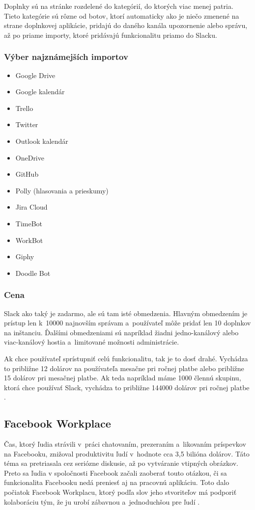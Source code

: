 \indent Doplnky sú na stránke rozdelené do kategórií, do ktorých viac menej patria. Tieto kategórie sú rôzne od botov, ktorí automaticky ako je niečo zmenené na strane doplnkovej aplikácie, pridajú do daného kanála upozornenie alebo správu, až po priame importy, ktoré pridávajú funkcionalitu priamo do Slacku.
\subsubsection{Výber najznámejších importov}
\begin{itemize}
    \item Google Drive
    \item Google kalendár
    \item Trello
    \item Twitter
    \item Outlook kalendár
    \item OneDrive
    \item GitHub
    \item Polly (hlasovania a prieskumy)
    \item Jira Cloud
    \item TimeBot
    \item WorkBot
    \item Giphy
    \item Doodle Bot
\end{itemize}
\subsubsection{Cena}
\indent Slack ako taký je zadarmo, ale sú tam isté obmedzenia. Hlavným obmedzením je prístup len k 10000 najnovším správam a používateľ môže pridať len 10 doplnkov na inštanciu. Ďalšími obmedzeniami sú napríklad žiadni jedno-kanálový alebo viac-kanálový hostia a limitované možnosti administrácie. 

\indent Ak chce používateľ sprístupniť celú funkcionalitu, tak je to dosť drahé. Vychádza to približne 12 dolárov na používateľa mesačne pri ročnej platbe alebo približne 15 dolárov pri mesačnej platbe. Ak teda napríklad máme 1000 člennú skupinu, ktorá chce používať Slack, vychádza to približne 144000 dolárov pri ročnej platbe \cite{slack}.

\subsection{Facebook Workplace}
\indent Čas, ktorý ľudia strávili v práci chatovaním, prezeraním a likovaním príspevkov na Facebooku, znižoval produktivitu ľudí v hodnote cca 3,5 bilióna dolárov. Táto téma sa pretriasala cez seriózne diskusie, až po vytváranie vtipných obrázkov. Preto sa ľudia v spoločnosti Facebook začali zaoberať touto otázkou, či sa funkcionalita Facebooku nedá preniesť aj na pracovnú aplikáciu. Toto dalo počiatok Facebook Workplacu, ktorý podľa slov jeho stvoriteľov má podporiť kolaboráciu tým, že ju urobí zábavnou a jednoduchšou pre ľudí \cite{facebook_workplace,facebook_workplace_2}.

